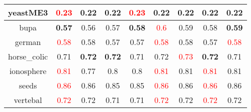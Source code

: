 \documentclass{article}%
\begin{document}
\begin{tabular}{c|cccccccc}
\hline%
yeastME3&\textcolor{red}{ 
0.23
}&0.22&0.22&\textcolor{red}{ 
0.23
}&0.22&0.22&0.22&0.22\\%
\hline%
bupa&\textbf{0.57}&0.56&0.57&\textbf{0.58}&\textcolor{red}{ 
0.6
}&0.59&0.58&\textbf{0.59}\\%
\hline%
german&\textcolor{red}{ 
0.58
}&0.58&0.57&0.57&\textcolor{red}{ 
0.58
}&0.58&0.57&\textcolor{red}{ 
0.58
}\\%
\hline%
horse\_colic&0.71&\textbf{0.72}&\textbf{0.72}&0.71&0.72&\textcolor{red}{ 
0.73
}&\textbf{0.72}&0.71\\%
\hline%
ionosphere&\textcolor{red}{ 
0.81
}&0.77&0.8&0.8&\textcolor{red}{ 
0.81
}&0.81&\textcolor{red}{ 
0.81
}&0.81\\%
\hline%
seeds&\textcolor{red}{ 
0.86
}&0.86&0.85&0.85&\textcolor{red}{ 
0.86
}&0.86&\textcolor{red}{ 
0.86
}&0.86\\%
\hline%
vertebal&\textcolor{red}{ 
0.72
}&0.72&0.71&0.71&\textcolor{red}{ 
0.72
}&0.72&\textcolor{red}{ 
0.72
}&0.72\\%
\hline%
\end{tabular}

%
\end{document}
